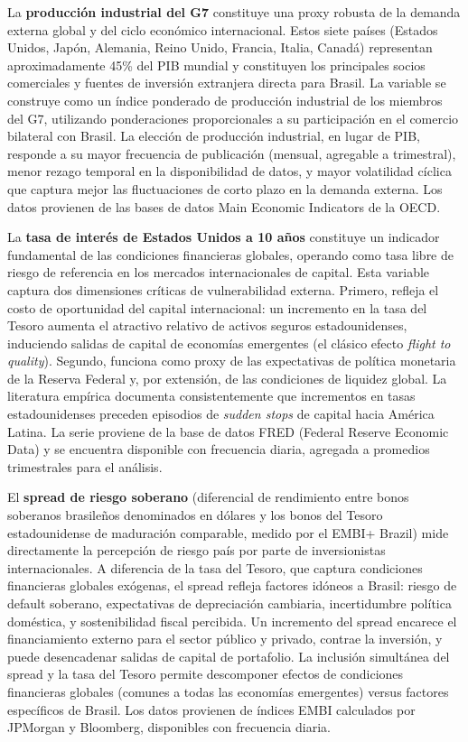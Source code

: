 \documentclass[3p,11pt,draft,natbib=false]{elsarticle}
\begin{document}
La \textbf{producción industrial del G7} constituye una proxy robusta de la demanda externa global y del ciclo económico internacional. Estos siete países (Estados Unidos, Japón, Alemania, Reino Unido, Francia, Italia, Canadá) representan aproximadamente 45\% del PIB mundial y constituyen los principales socios comerciales y fuentes de inversión extranjera directa para Brasil. La variable se construye como un índice ponderado de producción industrial de los miembros del G7, utilizando ponderaciones proporcionales a su participación en el comercio bilateral con Brasil. La elección de producción industrial, en lugar de PIB, responde a su mayor frecuencia de publicación (mensual, agregable a trimestral), menor rezago temporal en la disponibilidad de datos, y mayor volatilidad cíclica que captura mejor las fluctuaciones de corto plazo en la demanda externa. Los datos provienen de las bases de datos Main Economic Indicators de la OECD.

La \textbf{tasa de interés de Estados Unidos a 10 años} constituye un indicador fundamental de las condiciones financieras globales, operando como tasa libre de riesgo de referencia en los mercados internacionales de capital. Esta variable captura dos dimensiones críticas de vulnerabilidad externa. Primero, refleja el costo de oportunidad del capital internacional: un incremento en la tasa del Tesoro aumenta el atractivo relativo de activos seguros estadounidenses, induciendo salidas de capital de economías emergentes (el clásico efecto \textit{flight to quality}). Segundo, funciona como proxy de las expectativas de política monetaria de la Reserva Federal y, por extensión, de las condiciones de liquidez global. La literatura empírica documenta consistentemente que incrementos en tasas estadounidenses preceden episodios de \textit{sudden stops} de capital hacia América Latina. La serie proviene de la base de datos FRED (Federal Reserve Economic Data) y se encuentra disponible con frecuencia diaria, agregada a promedios trimestrales para el análisis.

El \textbf{spread de riesgo soberano} (diferencial de rendimiento entre bonos soberanos brasileños denominados en dólares y los bonos del Tesoro estadounidense de maduración comparable, medido por el EMBI+ Brazil) mide directamente la percepción de riesgo país por parte de inversionistas internacionales. A diferencia de la tasa del Tesoro, que captura condiciones financieras globales exógenas, el spread refleja factores idóneos a Brasil: riesgo de default soberano, expectativas de depreciación cambiaria, incertidumbre política doméstica, y sostenibilidad fiscal percibida. Un incremento del spread encarece el financiamiento externo para el sector público y privado, contrae la inversión, y puede desencadenar salidas de capital de portafolio. La inclusión simultánea del spread y la tasa del Tesoro permite descomponer efectos de condiciones financieras globales (comunes a todas las economías emergentes) versus factores específicos de Brasil. Los datos provienen de índices EMBI calculados por JPMorgan y Bloomberg, disponibles con frecuencia diaria.
\end{document}
